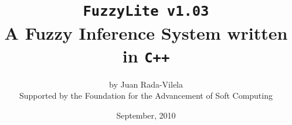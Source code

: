 \documentclass[11pt, final, a4paper, openany]{book}
\newcommand{\fl}{\texttt{FuzzyLite v1.03}}
\begin{document}
	\title{\fl\\A Fuzzy Inference System written in \texttt{C++}}
	\author{by Juan Rada-Vilela\\ \footnotesize Supported by the Foundation for the Advancement of Soft Computing}
	\date{September, 2010}
	
	\maketitle
	\setcounter{tocdepth}{4}
	
	\tableofcontents
	\listoffigures
	\pagestyle{fancy}	

	
	
	
	
	
\end{document}
